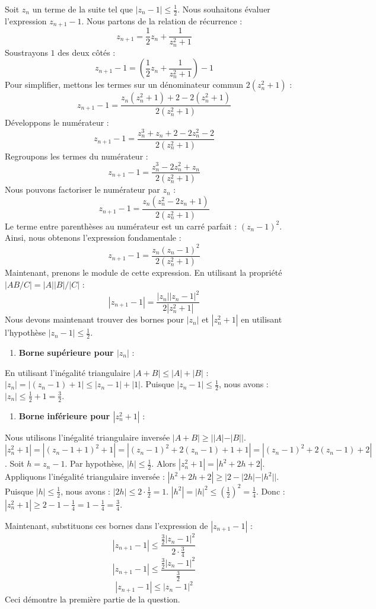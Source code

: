 \documentclass[a4paper,11pt]{report}
\begin{document}
Soit $z_n$ un terme de la suite tel que $|z_n - 1| \le \frac{1}{2}$. Nous souhaitons évaluer l'expression $z_{n+1} - 1$.
Nous partons de la relation de récurrence :
$$z_{n+1} = \frac{1}{2} z_n + \frac{1}{z_n^2+1}$$
Soustrayons $1$ des deux côtés :
$$z_{n+1} - 1 = \left(\frac{1}{2} z_n + \frac{1}{z_n^2+1}\right) - 1$$
Pour simplifier, mettons les termes sur un dénominateur commun $2(z_n^2+1)$ :
$$z_{n+1} - 1 = \frac{z_n(z_n^2+1) + 2 - 2(z_n^2+1)}{2(z_n^2+1)}$$
Développons le numérateur :
$$z_{n+1} - 1 = \frac{z_n^3 + z_n + 2 - 2z_n^2 - 2}{2(z_n^2+1)}$$
Regroupons les termes du numérateur :
$$z_{n+1} - 1 = \frac{z_n^3 - 2z_n^2 + z_n}{2(z_n^2+1)}$$
Nous pouvons factoriser le numérateur par $z_n$ :
$$z_{n+1} - 1 = \frac{z_n(z_n^2 - 2z_n + 1)}{2(z_n^2+1)}$$
Le terme entre parenthèses au numérateur est un carré parfait : $(z_n - 1)^2$.
Ainsi, nous obtenons l'expression fondamentale :
$$z_{n+1} - 1 = \frac{z_n(z_n - 1)^2}{2(z_n^2+1)}$$
Maintenant, prenons le module de cette expression. En utilisant la propriété $|AB/C| = |A||B|/|C|$ :
$$|z_{n+1} - 1| = \frac{|z_n| |z_n - 1|^2}{2|z_n^2+1|}$$
Nous devons maintenant trouver des bornes pour $|z_n|$ et $|z_n^2+1|$ en utilisant l'hypothèse $|z_n - 1| \le \frac{1}{2}$.
\begin{enumerate}
\item \textbf{Borne supérieure pour $|z_n|$} :
\end{enumerate}
    En utilisant l'inégalité triangulaire $|A+B| \le |A|+|B|$ :
    $|z_n| = |(z_n - 1) + 1| \le |z_n - 1| + |1|$.
    Puisque $|z_n - 1| \le \frac{1}{2}$, nous avons :
    $|z_n| \le \frac{1}{2} + 1 = \frac{3}{2}$.
\begin{enumerate}
\item \textbf{Borne inférieure pour $|z_n^2+1|$} :
\end{enumerate}
    Nous utilisons l'inégalité triangulaire inversée $|A+B| \ge ||A|-|B||$.
    $|z_n^2+1| = |(z_n-1+1)^2+1| = |(z_n-1)^2+2(z_n-1)+1+1| = |(z_n-1)^2+2(z_n-1)+2|$.
    Soit $h = z_n-1$. Par hypothèse, $|h| \le \frac{1}{2}$.
    Alors $|z_n^2+1| = |h^2+2h+2|$.
    Appliquons l'inégalité triangulaire inversée :
    $|h^2+2h+2| \ge |2 - |2h| - |h^2||$.
    Puisque $|h| \le \frac{1}{2}$, nous avons :
    $|2h| \le 2 \cdot \frac{1}{2} = 1$.
    $|h^2| = |h|^2 \le \left(\frac{1}{2}\right)^2 = \frac{1}{4}$.
    Donc :
    $|z_n^2+1| \ge 2 - 1 - \frac{1}{4} = 1 - \frac{1}{4} = \frac{3}{4}$.

Maintenant, substituons ces bornes dans l'expression de $|z_{n+1} - 1|$ :
$$|z_{n+1} - 1| \le \frac{\frac{3}{2} |z_n - 1|^2}{2 \cdot \frac{3}{4}}$$
$$|z_{n+1} - 1| \le \frac{\frac{3}{2} |z_n - 1|^2}{\frac{3}{2}}$$
$$|z_{n+1} - 1| \le |z_n - 1|^2$$
Ceci démontre la première partie de la question.
\end{document}
